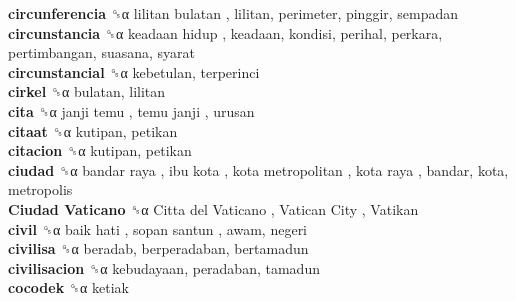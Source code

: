 \textbf{circunferencia} ␝α   lilitan bulatan , lilitan, perimeter, pinggir, sempadan  \\
\textbf{circunstancia} ␝α   keadaan hidup , keadaan, kondisi, perihal, perkara, pertimbangan, suasana, syarat  \\
\textbf{circunstancial} ␝α  kebetulan, terperinci  \\
\textbf{cirkel} ␝α  bulatan, lilitan  \\
\textbf{cita} ␝α   janji temu ,  temu janji , urusan  \\
\textbf{citaat} ␝α  kutipan, petikan  \\
\textbf{citacion} ␝α  kutipan, petikan  \\
\textbf{ciudad} ␝α   bandar raya ,  ibu kota ,  kota metropolitan ,  kota raya , bandar, kota, metropolis  \\
\textbf{Ciudad Vaticano} ␝α   Citta del Vaticano ,  Vatican City ,  Vatikan   \\
\textbf{civil} ␝α   baik hati ,  sopan santun , awam, negeri  \\
\textbf{civilisa} ␝α  beradab, berperadaban, bertamadun  \\
\textbf{civilisacion} ␝α  kebudayaan, peradaban, tamadun  \\
\textbf{cocodek} ␝α  ketiak  \\
